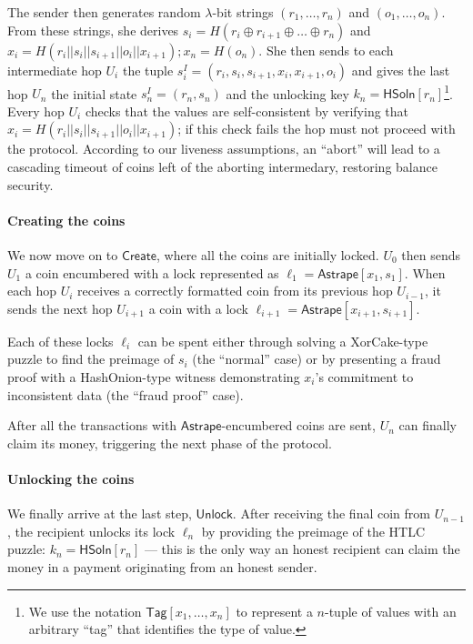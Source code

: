 \documentclass[USenglish,oneside,twocolumn]{article}
\begin{document}
The sender then generates random $\lambda$-bit strings $(r_1,\dots,r_n)$ and $(o_1,\dots,o_n)$. From these strings, she derives $s_i=H(r_i\oplus r_{i+1}\oplus\dots \oplus r_n)$ and $x_i=H(r_i||s_i||s_{i+1}||o_i||x_{i+1}); x_n=H(o_n)$. She then sends to each intermediate hop $U_i$ the tuple $s^I_i=(r_i,s_i,s_{i+1},x_i,x_{i+1},o_i)$ and gives the last hop $U_n$ the initial state $s^I_n=(r_n,s_n)$ and the unlocking key $k_n=\mathsf{HSoln}[r_n]$\footnote{We use the notation $\mathsf{Tag}[x_1, \dots, x_n]$ to represent a $n$-tuple of values with an arbitrary ``tag'' that identifies the type of value.}.  Every hop $U_i$ checks that the values are self-consistent by verifying that $x_i=H(r_i||s_i||s_{i+1}||o_i||x_{i+1})$; if this check fails the hop must not proceed with the protocol. According to our liveness assumptions, an ``abort'' will lead to a cascading timeout of coins left of the aborting intermedary, restoring balance security.

\paragraph*{Creating the coins}

We now move on to $\mathsf{Create}$, where all the coins are initially locked. $U_0$ then sends $U_1$ a coin encumbered with a lock represented as $\ell_1 = \mathsf{Astrape}[x_1,s_1]$. When each hop $U_i$ receives a correctly formatted coin from its previous hop $U_{i-1}$, it sends the next hop $U_{i+1}$ a coin with a lock $\ell_{i+1} = \mathsf{Astrape}[x_{i+1}, s_{i+1}]$.

Each of these locks $\ell_i$ can be spent either through solving a XorCake-type puzzle to find the preimage of $s_i$ (the ``normal'' case) or by presenting a fraud proof with a HashOnion-type witness demonstrating $x_i$'s commitment to inconsistent data (the ``fraud proof'' case).

After all the transactions with $\mathsf{Astrape}$-encumbered coins are sent, $U_n$ can finally claim its money, triggering the next phase of the protocol.

\paragraph*{Unlocking the coins}

We finally arrive at the last step, $\mathsf{Unlock}$. After receiving the final coin from $U_{n-1}$, the recipient unlocks its lock $\ell_n$ by providing the preimage of the HTLC puzzle: $k_n = \mathsf{HSoln}[r_n]$ --- this is the only way an honest recipient can claim the money in a payment originating from an honest sender.
\end{document}
